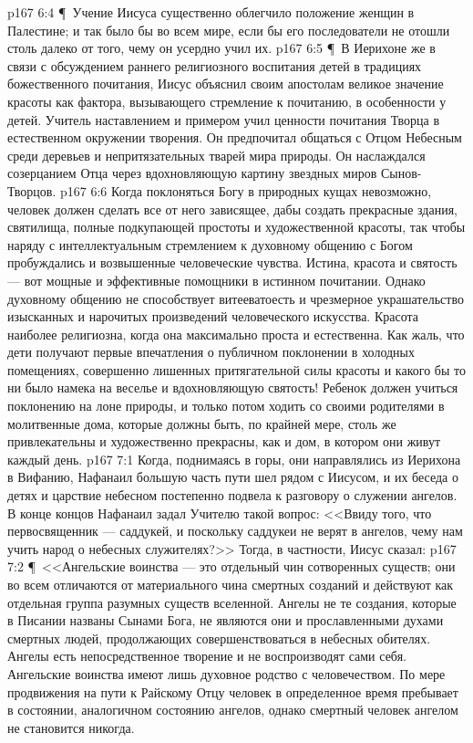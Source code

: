 \vs p167 6:4 \P\ Учение Иисуса существенно облегчило положение женщин в Палестине; и так было бы во всем мире, если бы его последователи не отошли столь далеко от того, чему он усердно учил их.
\vs p167 6:5 \P\ В Иерихоне же в связи с обсуждением раннего религиозного воспитания детей в традициях божественного почитания, Иисус объяснил своим апостолам великое значение красоты как фактора, вызывающего стремление к почитанию, в особенности у детей. Учитель наставлением и примером учил ценности почитания Творца в естественном окружении творения. Он предпочитал общаться с Отцом Небесным среди деревьев и непритязательных тварей мира природы. Он наслаждался созерцанием Отца через вдохновляющую картину звездных миров Сынов\hyp{}Творцов.
\vs p167 6:6 Когда поклоняться Богу в природных кущах невозможно, человек должен сделать все от него зависящее, дабы создать прекрасные здания, святилища, полные подкупающей простоты и художественной красоты, так чтобы наряду с интеллектуальным стремлением к духовному общению с Богом пробуждались и возвышенные человеческие чувства. Истина, красота и святость --- вот мощные и эффективные помощники в истинном почитании. Однако духовному общению не способствует витееватоесть и чрезмерное украшательство изысканных и нарочитых произведений человеческого искусства. Красота наиболее религиозна, когда она максимально проста и естественна. Как жаль, что дети получают первые впечатления о публичном поклонении в холодных помещениях, совершенно лишенных притягательной силы красоты и какого бы то ни было намека на веселье и вдохновляющую святость! Ребенок должен учиться поклонению на лоне природы, и только потом ходить со своими родителями в молитвенные дома, которые должны быть, по крайней мере, столь же привлекательны и художественно прекрасны, как и дом, в котором они живут каждый день.
\vs p167 7:1 Когда, поднимаясь в горы, они направлялись из Иерихона в Вифанию, Нафанаил большую часть пути шел рядом с Иисусом, и их беседа о детях и царствие небесном постепенно подвела к разговору о служении ангелов. В конце концов Нафанаил задал Учителю такой вопрос: <<Ввиду того, что первосвященник --- саддукей, и поскольку саддукеи не верят в ангелов, чему нам учить народ о небесных служителях?>> Тогда, в частности, Иисус сказал:
\vs p167 7:2 \P\ <<Ангельские воинства --- это отдельный чин сотворенных существ; они во всем отличаются от материального чина смертных созданий и действуют как отдельная группа разумных существ вселенной. Ангелы не те создания, которые в Писании названы Сынами Бога, не являются они и прославленными духами смертных людей, продолжающих совершенствоваться в небесных обителях. Ангелы есть непосредственное творение и не воспроизводят сами себя. Ангельские воинства имеют лишь духовное родство с человечеством. По мере продвижения на пути к Райскому Отцу человек в определенное время пребывает в состоянии, аналогичном состоянию ангелов, однако смертный человек ангелом не становится никогда.
